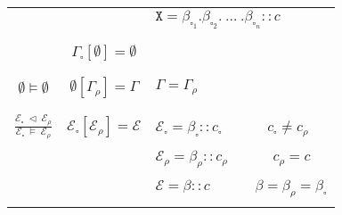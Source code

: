 \documentclass{entcs}
\renewcommand{\~}[0]{\texttildelow}
\begin{document}
\begin{defn}
\begin{center}
{\begin{tabular}{ c | | c | l }
     &  & $ \mathtt{X} = \beta_{\square_1}.\beta_{\square_2}.~...~.\beta_{\square_n}::c $ \\

    & & \\[0.02cm]
    \hline
    & & \\[0.02cm]

	 & 
    $ \Gamma_{\square}[\emptyset] = \emptyset $ & \\

    & & \\[0.02cm]
    \hline
    & & \\[0.02cm]

	$\emptyset \models \emptyset $ & 
    $ \emptyset[\Gamma_\rho] = \Gamma $ & 
    $\Gamma = \Gamma_\rho $ \\

    & & \\[0.02cm]
    \hline
    & & \\[0.02cm]

	$ \frac{\mathcal{E}_{\square}~\lhd~\mathcal{E}_\rho}{\mathcal{E}_{\square}~\models~\mathcal{E}_\rho} $ & 
    $ \mathcal{E}_{\square}[\mathcal{E}_\rho] = \mathcal{E} $ & 
    $ \mathcal{E}_{\square} = \beta_{\square}::c_{\square} $ ~~~~~ $ c_{\square} \neq c_\rho $ \\

    &  & $ \mathcal{E}_\rho = \beta_\rho::c_\rho $ ~~~~~ $ c_\rho = c $\\

    &  & $ \mathcal{E} = \beta::c $ ~~~~~ $ \beta = \beta_\rho = \beta_{\square} $\\

    & & \\[0.02cm]
    \hline
    \end{tabular}}
    \end{center}

\end{defn}






\end{document}

